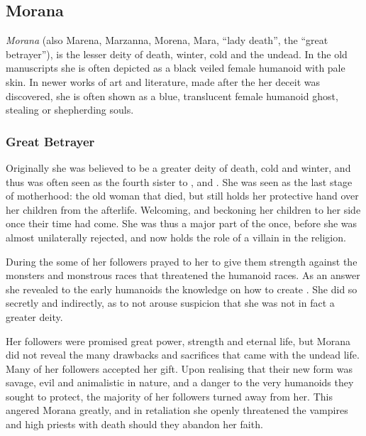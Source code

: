 \subsection{Morana}
\label{sec:Morana}


\emph{Morana} (also Marena, Marzanna, Morena, Mara, ``lady death'', the
``great betrayer''), is the lesser deity of death, winter, cold and the undead.
In the old manuscripts she is often depicted as a black veiled female humanoid
with pale skin. In newer works of art and literature, made after the her
deceit was discovered, she is often shown as a blue, translucent female
humanoid ghost, stealing or shepherding souls.

\subsubsection{Great Betrayer}
\label{sec:Great Betrayer}

Originally she was believed to be a greater deity of death, cold and winter,
and thus was often seen as the fourth sister to ,
 and . She was seen as the last stage
of motherhood: the old woman that died, but still holds her protective hand
over her children from the afterlife. Welcoming, and beckoning her children to
her side once their time had come. She was thus a major part of the
 once, before she was almost unilaterally rejected, and
now holds the role of a villain in the religion.

During the  some of her followers prayed to her to
give them strength against the monsters and monstrous races that threatened
the humanoid races. As an answer she revealed to the early humanoids the
knowledge on how to create . She did so secretly and
indirectly, as to not arouse suspicion that she was not in fact a greater
deity.

Her followers were promised great power, strength and eternal life, but Morana
did not reveal the many drawbacks and sacrifices that came with the undead
life. Many of her followers accepted her gift. Upon realising that their new
form was savage, evil and animalistic in nature, and a danger to the very
humanoids they sought to protect, the majority of her followers turned away
from her. This angered Morana greatly, and in retaliation she openly
threatened the vampires and high priests with death should they abandon her
faith.

